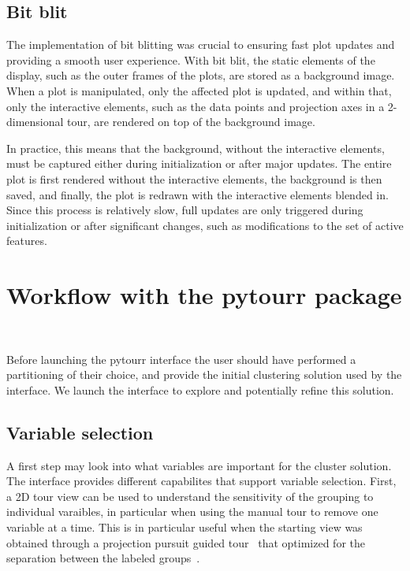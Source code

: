 \documentclass[article]{ajs}
\begin{document}
\subsection{Bit blit}

The implementation of bit blitting was crucial to ensuring fast plot updates and providing a smooth user experience. With bit blit, the static elements of the display, such as the outer frames of the plots, are stored as a background image. When a plot is manipulated, only the affected plot is updated, and within that, only the interactive elements, such as the data points and projection axes in a 2-dimensional tour, are rendered on top of the background image.

In practice, this means that the background, without the interactive elements, must be captured either during initialization or after major updates. The entire plot is first rendered without the interactive elements, the background is then saved, and finally, the plot is redrawn with the interactive elements blended in. Since this process is relatively slow, full updates are only triggered during initialization or after significant changes, such as modifications to the set of active features.

\section{Workflow with the pytourr package}~\label{workflow}

Before launching the pytourr interface the user should have performed a partitioning of their choice, and provide the initial clustering solution used by the interface. We launch the interface to explore and potentially refine this solution.

\subsection{Variable selection}

A first step may look into what variables are important for the cluster solution. The interface provides different capabilites that support variable selection. First, a 2D tour view can be used to understand the sensitivity of the grouping to individual varaibles, in particular when using the manual tour to remove one variable at a time. This is in particular useful when the starting view was obtained through a projection pursuit guided tour~\cite{CBCH94} that optimized for the separation between the labeled groups~\cite{lckl2005}.
\end{document}
